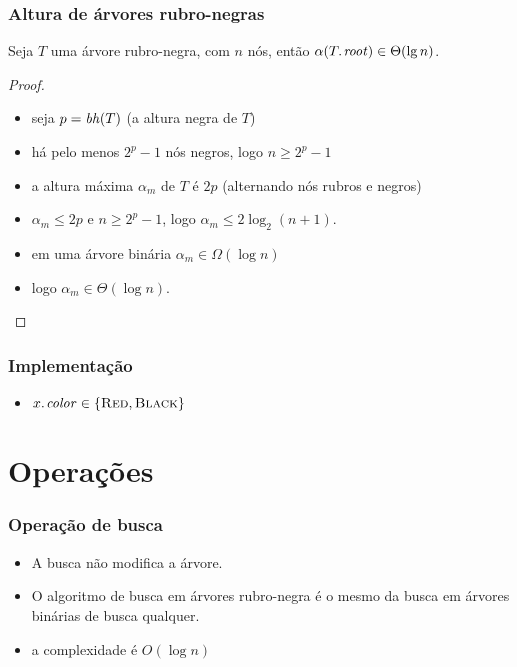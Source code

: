 \documentclass{beamer}
\newcommand{\bh}[0]{\ensuremath{\id{bh}}}
\begin{document}
\begin{frame}
\frametitle{Altura de árvores rubro-negras}

\begin{theorem}
Seja $T$ uma árvore rubro-negra, com $n$ nós, então $\alpha(\attrib{T}{root}) \in \Theta(\lg n)$.
\end{theorem}

\begin{proof}
\begin{itemize}
\item seja $p = \bh(T)$ (a altura negra de $T$)
\item há pelo menos $2^p - 1$ nós negros, logo $n \ge 2^p - 1$
\item a altura máxima $\alpha_m$ de $T$ é $2p$ (alternando nós rubros e negros)
\item $\alpha_m \le 2p$ e $n \ge 2^p - 1$, logo $\alpha_m \le 2 \log_2 (n+1)$.
\item em uma árvore binária $\alpha_m \in \Omega(\log n)$
\item logo $\alpha_m \in \Theta(\log n)$.
\end{itemize}
\end{proof}

\end{frame}

\begin{frame}

\frametitle{Implementação}

\begin{itemize}
\item $\attrib{x}{color} \in \{\const{Red}, \const{Black} \}$
\end{itemize}

\end{frame}

\section{Operações}

\begin{frame}

\frametitle{Operação de busca}

\begin{itemize}
\item A busca não modifica a árvore.

\item O algoritmo de busca em árvores rubro-negra é o mesmo da busca em árvores
  binárias de busca qualquer.

\item a complexidade é $O(\log n)$

\end{itemize}
\end{frame}
\end{document}
